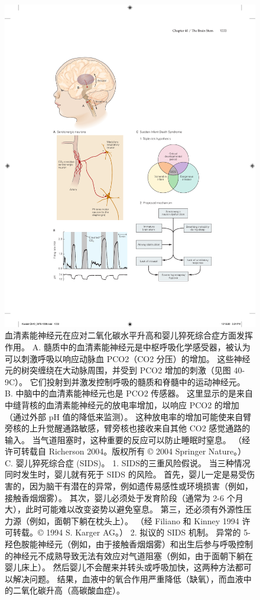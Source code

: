 \begin{figure}[htbp]
	\centering
	\includegraphics[width=0.8\linewidth]{chap40/fig_40_13}
	\caption{血清素能神经元在应对二氧化碳水平升高和婴儿猝死综合症方面发挥作用。 A. 髓质中的血清素能神经元是中枢呼吸化学感受器，被认为可以刺激呼吸以响应动脉血 PCO2（CO2 分压）的增加。 这些神经元的树突缠绕在大动脉周围，并受到 PCO2 增加的刺激（见图 40-9C）。 它们投射到并激发控制呼吸的髓质和脊髓中的运动神经元。 B. 中脑中的血清素能神经元也是 PCO2 传感器。 这里显示的是来自中缝背核的血清素能神经元的放电率增加，以响应 PCO2 的增加（通过外部 pH 值的降低来监测）。 这种放电率的增加可能使来自臂旁核的上升觉醒通路敏感，臂旁核也接收来自其他 CO2 感觉通路的输入。 当气道阻塞时，这种重要的反应可以防止睡眠时窒息。 （经许可转载自 Richerson 2004。版权所有 © 2004 Springer Nature。） C. 婴儿猝死综合症 (SIDS)。 1. SIDS的三重风险假说。 当三种情况同时发生时，婴儿就有死于 SIDS 的风险。 首先，婴儿一定是易受伤害的，因为脑干有潜在的异常，例如遗传易感性或环境损害（例如，接触香烟烟雾）。 其次，婴儿必须处于发育阶段（通常为 2-6 个月大），此时可能难以改变姿势以避免窒息。 第三，还必须有外源性压力源（例如，面朝下躺在枕头上）。 （经 Filiano 和 Kinney 1994 许可转载。© 1994 S. Karger AG。） 2. 拟议的 SIDS 机制。 异常的 5-羟色胺能神经元（例如，由于接触香烟烟雾）和出生后参与呼吸控制的神经元不成熟导致无法有效应对气道阻塞（例如，由于面朝下躺在婴儿床上）。 然后婴儿不会醒来并转头或呼吸加快，这两种方法都可以解决问题。 结果，血液中的氧合作用严重降低（缺氧），而血液中的二氧化碳升高（高碳酸血症）。}
	\label{fig:40_13}
\end{figure}


